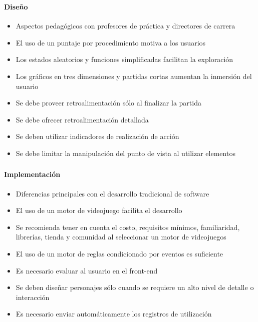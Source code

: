\begin{frame}
\frametitle{\pagetitle}
\framesubtitle{Diseño}
\begin{itemize}[<+->]


\item Aspectos pedagógicos con profesores de práctica y directores de
        carrera

\item El uso de un puntaje por procedimiento motiva a los usuarios

\item Los estados aleatorios y funciones simplificadas facilitan la exploración

\item Los gráficos en tres dimensiones y partidas cortas aumentan la inmersión del usuario

\item Se debe proveer retroalimentación sólo al finalizar la partida

\item Se debe ofrecer retroalimentación detallada

\item Se deben utilizar indicadores de realización de acción

\item Se debe limitar la manipulación del punto de vista al utilizar elementos

\end{itemize}
\end{frame}

\begin{frame}
\frametitle{\pagetitle}
\framesubtitle{Implementación}
\begin{itemize}[<+->]

\item Diferencias principales con el desarrollo tradicional de software

\item El uso de un motor de videojuego facilita el desarrollo

\item Se recomienda tener en cuenta el costo, requisitos mínimos, familiaridad,
    librerías, tienda y comunidad al seleccionar un motor de videojuegos
    
\item El uso de un motor de reglas condicionado por eventos es suficiente

\item Es necesario evaluar al usuario en el front-end

\item Se deben diseñar personajes sólo cuando se requiere un alto nivel de
    detalle o interacción

\item Es necesario enviar automáticamente los registros de utilización 

\end{itemize}
\end{frame}

